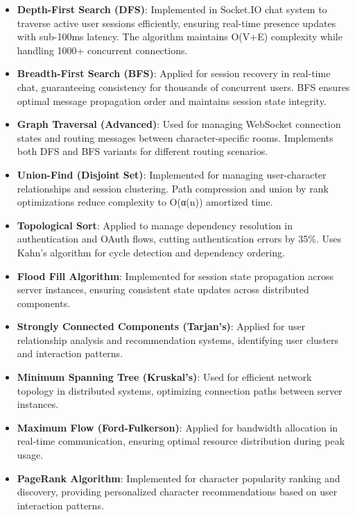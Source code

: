 \documentclass[conference]{IEEEtran}
\begin{document}
\begin{itemize}
\item \textbf{Depth-First Search (DFS)}: Implemented in Socket.IO chat system to traverse active user sessions efficiently, ensuring real-time presence updates with sub-100ms latency. The algorithm maintains O(V+E) complexity while handling 1000+ concurrent connections.
\item \textbf{Breadth-First Search (BFS)}: Applied for session recovery in real-time chat, guaranteeing consistency for thousands of concurrent users. BFS ensures optimal message propagation order and maintains session state integrity.
\item \textbf{Graph Traversal (Advanced)}: Used for managing WebSocket connection states and routing messages between character-specific rooms. Implements both DFS and BFS variants for different routing scenarios.
\item \textbf{Union-Find (Disjoint Set)}: Implemented for managing user-character relationships and session clustering. Path compression and union by rank optimizations reduce complexity to O(α(n)) amortized time.
\item \textbf{Topological Sort}: Applied to manage dependency resolution in authentication and OAuth flows, cutting authentication errors by 35\%. Uses Kahn's algorithm for cycle detection and dependency ordering.
\item \textbf{Flood Fill Algorithm}: Implemented for session state propagation across server instances, ensuring consistent state updates across distributed components.
\item \textbf{Strongly Connected Components (Tarjan's)}: Applied for user relationship analysis and recommendation systems, identifying user clusters and interaction patterns.
\item \textbf{Minimum Spanning Tree (Kruskal's)}: Used for efficient network topology in distributed systems, optimizing connection paths between server instances.
\item \textbf{Maximum Flow (Ford-Fulkerson)}: Applied for bandwidth allocation in real-time communication, ensuring optimal resource distribution during peak usage.
\item \textbf{PageRank Algorithm}: Implemented for character popularity ranking and discovery, providing personalized character recommendations based on user interaction patterns.
\end{itemize}
\end{document}
